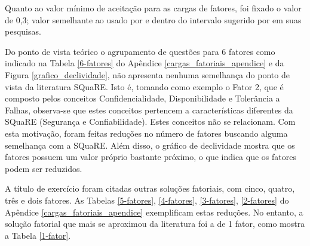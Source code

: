 Quanto ao valor mínimo de aceitação para as cargas de fatores, foi fixado o valor de 0,3; valor semelhante ao usado por  e dentro do intervalo sugerido por  em suas pesquisas.




Do ponto de vista teórico o agrupamento de questões para 6 fatores como indicado na Tabela \ref{6-fatores} do Apêndice \ref{cargas_fatoriais_apendice} e da Figura \ref{grafico_declividade}, não apresenta nenhuma semelhança do ponto de vista da literatura SQuaRE. Isto é, tomando como exemplo o Fator 2, que é composto pelos conceitos Confidencialidade, Disponibilidade e Tolerância a Falhas, observa-se que estes conceitos pertencem a características diferentes da SQuaRE (Segurança e Confiabilidade). Estes conceitos não se relacionam. Com esta motivação, foram feitas reduções no número de fatores buscando alguma semelhança com a SQuaRE. Além disso, o gráfico de declividade mostra que os fatores possuem um valor próprio bastante próximo, o que indica que os fatores podem ser reduzidos.


A título de exercício foram citadas outras soluções fatoriais, com cinco, quatro, três e dois fatores. As Tabelas \ref{5-fatores}, \ref{4-fatores}, \ref{3-fatores}, \ref{2-fatores} do Apêndice \ref{cargas_fatoriais_apendice} exemplificam estas reduções. No entanto, a solução fatorial que mais se aproximou da literatura foi a de 1 fator, como mostra a Tabela \ref{1-fator}.
       
